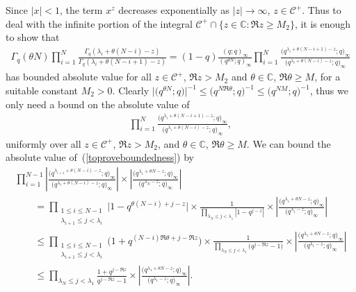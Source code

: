 \documentclass[pdftex]{sigma}
\numberwithin{equation}{section}
\newcommand{\C}{\mathbb{C}}
\newcommand{\CC}{\mathcal{C}}
\begin{document}
Since $|x| < 1$, the term $x^z$ decreases exponentially as $|z|\rightarrow\infty$, $z\in\CC^+$. Thus to deal with the inf\/inite portion of the integral $\CC^+\cap\{z\in\C\colon \Re z \geq M_2\}$, it is enough to show that
\begin{gather*}
\Gamma_q(\theta N)\prod_{i=1}^N{\frac{\Gamma_q(\lambda_i + \theta(N - i) - z)}{\Gamma_q(\lambda_i + \theta(N - i + 1) - z)}} = (1 - q)\frac{(q; q)_{\infty}}{(q^{\theta N}; q)_{\infty}}\prod_{i=1}^N{\frac{\big(q^{\lambda_i + \theta(N - i + 1) - z}; q\big)_{\infty}}{\big(q^{\lambda_i + \theta (N - i) - z}; q\big)_{\infty}}}
\end{gather*}
has bounded absolute value for all $z\in\CC^+$, $\Re z > M_2$ and $\theta\in\C$, $\Re\theta \geq M$, for a suitable constant $M_2 > 0$. Clearly $\big|\big(q^{\theta N}; q\big)\big|^{-1} \leq \big(q^{N\Re\theta}; q\big)^{-1} \leq \big(q^{NM}; q\big)^{-1}$, thus we only need a bound on the absolute value of
\begin{gather}\label{toproveboundedness}
\prod_{i=1}^N{\frac{\big(q^{\lambda_i + \theta(N - i + 1) - z}; q\big)_{\infty}}{\big(q^{\lambda_i + \theta (N - i) - z}; q\big)_{\infty}}},
\end{gather}
uniformly over all $z\in\CC^+$, $\Re z > M_2$, and $\theta\in\C$, $\Re\theta \geq M$. We can bound the absolute value of~(\ref{toproveboundedness}) by
\begin{gather*}
\prod_{i=1}^{N-1}{\left|\frac{\big(q^{\lambda_{i+1} + \theta(N - i) - z}; q\big)_{\infty}}{\big(q^{\lambda_i + \theta (N - i) - z}; q\big)_{\infty}}\right|}\times\left|\frac{\big(q^{\lambda_1 + \theta N - z}; q\big)_{\infty}}{\big(q^{\lambda_N - z}; q\big)_{\infty}}\right|\\
\qquad{} = \prod_{ \substack{1\leq i\leq N - 1 \\ \lambda_{i+1} \leq j < \lambda_i} }{\big|1 - q^{\theta(N - i) + j - z}\big|}\times\frac{1}{\prod\limits_{\lambda_N \leq j < \lambda_1}{|1 - q^{j - z}|}}
\times\left|\frac{\big(q^{\lambda_1 + \theta N - z}; q\big)_{\infty}}{\big(q^{\lambda_1 - z}; q\big)_{\infty}}\right|\\
\qquad{} \leq \prod_{ \substack{1\leq i\leq N - 1 \\ \lambda_{i+1} \leq j < \lambda_i} }{\big(1 + q^{(N - i)\Re\theta + j - \Re z}\big)}\times\frac{1}{\prod\limits_{\lambda_N \leq j < \lambda_1}{\big(q^{j-\Re z} - 1\big)}}\times\left|\frac{\big(q^{\lambda_1 + \theta N - z}; q\big)_{\infty}}{\big(q^{\lambda_1 - z}; q\big)_{\infty}}\right|\\
\qquad{} \leq \prod_{\lambda_N \leq j < \lambda_1}{\frac{1 + q^{j - \Re z}}{q^{j - \Re z} - 1}}\times\left|\frac{\big(q^{\lambda_1 + \theta N - z}; q\big)_{\infty}}{\big(q^{\lambda_1 - z}; q\big)_{\infty}}\right|.
\end{gather*}
\end{document}
